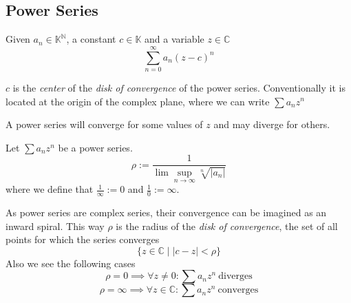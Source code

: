 \subsection{Power Series}
\begin{definition}\label{def:power_series}
   Given \(a_n \in \mathbb{K}^\mathbb{N}\), a constant \(c \in \mathbb{K}\) and a variable \(z \in \mathbb{C}\)
   \[\sum_{n=0}^\infty a_n (z - c)^n\]
\end{definition}
\begin{remark}[Terminology]
   \(c\) is the \emph{center} of the \emph{disk of convergence} of the power series.
   Conventionally it is located at the origin of the complex plane, where we can write \(\sum a_n z^n\)
\end{remark}
A power series will converge for some values of \(z\) and may diverge for others.
\begin{definition}
   Let \(\sum a_n z^n\) be a power series.
   \[\rho := \frac{1}{\lim\sup_{n \to \infty} \sqrt[n]{|a_n|}}\]
   where we define that \(\frac{1}{\infty} := 0\) and \(\frac{1}{0} := \infty\).
\end{definition}
\begin{remark}[Intuition]
   As power series are complex series, their convergence can be imagined as an inward spiral.
   This way \(\rho\) is the radius of the \emph{disk of convergence}, the set of all points for which the series converges
   \[\{z \in \mathbb{C} \mid |c - z| < \rho\}\]
   Also we see the following cases
   \[\rho = 0 \implies \forall z \neq 0: \sum a_n z^n~\text{diverges}\]
   \[\rho = \infty \implies \forall z \in \mathbb{C}: \sum a_n z^n~\text{converges}\]
\end{remark}

%    

